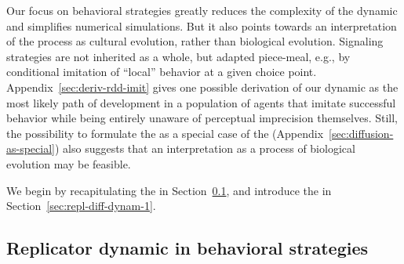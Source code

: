 \documentclass[fleqn,reqno,10pt]{article}
\newcommand{\rd}{\acro{rd}} %
\newcommand{\rmd}{\acro{rmd}} %
\newcommand{\rdd}{\acro{rdd}} %
\begin{document}
Our focus on behavioral strategies greatly reduces the complexity of the dynamic and simplifies
numerical simulations. But it also points towards an interpretation of the process as cultural
evolution, rather than biological evolution. Signaling strategies are not inherited as a whole,
but adapted piece-meal, e.g., by conditional imitation of ``local'' behavior at a given choice
point. Appendix~\ref{sec:deriv-rdd-imit} gives one possible derivation of our dynamic as the
most likely path of development in a population of agents that imitate successful behavior
while being entirely unaware of perceptual imprecision themselves. Still, the possibility to
formulate the \rdd as a special case of the \rmd (Appendix~\ref{sec:diffusion-as-special}) also
suggests that an interpretation as a process of biological evolution may be feasible.

We begin by recapitulating the \rd in Section~\ref{sec:repl-dynam-behav}, and introduce
the \rdd in Section~\ref{sec:repl-diff-dynam-1}.

\subsection{Replicator dynamic in behavioral strategies}
\label{sec:repl-dynam-behav}
\end{document}
